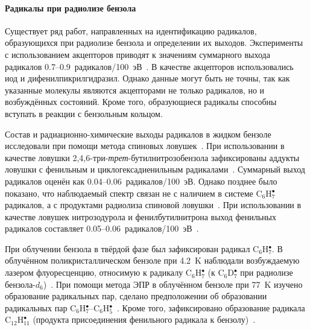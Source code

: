 {\paragraph{Радикалы при радиолизе бензола\\}
\label{rad}

Существует ряд работ, направленных на идентификацию радикалов, образующихся при радиолизе бензола и определении их выходов. 
Эксперименты с использованием  акцепторов приводят к значениям суммарного выхода радикалов 0.7--0.9~радикалов/100~эВ~\cite{Cherniak1964, Weber1955}.
В качестве акцепторов использовались иод и дифенилпикрилгидразил. Однако данные могут быть не точны, так как указанные молекулы 
являются акцепторами не только радикалов, но и возбуждённых состояний. Кроме того, образующиеся радикалы способны вступать 
в реакции с бензольным кольцом.

Состав и радиационно-химические выходы радикалов в жидком бензоле исследовали при помощи метода спиновых ловушек~\cite{Sargent1977}. 
При использовании в качестве ловушки 2,4,6-три-{\it трет}-бутилнитрозобензола зафиксированы аддукты ловушки с фенильным и 
циклогексадиенильным радикалами~\cite{ST1}. Суммарный выход радикалов оценён как 0.04--0.06~радикалов/100~эВ.
Однако позднее было показано, что наблюдаемый спектр связан не с наличием в системе C$_6$H$_7^\bullet$ радикалов, а с продуктами радиолиза спиновой ловушки~\cite{ST2}.
При использовании в качестве ловушек нитрозодурола и фенилбутилнитрона выход фенильных радикалов составляет 0.05--0.06~радикалов/100~эВ~\cite{ST1, ST3}. 

При облучении бензола в твёрдой фазе был зафиксирован радикал C$_6$H$_7^\bullet$.
В облучённом поликристаллическом бензоле при 4.2~K наблюдали возбуждаемую лазером флуоресценцию, относимую к радикалу C$_6$H$_7^\bullet$ 
(к C$_6$D$_7^\bullet$ при радиолизе бензола-$d_6$)~\cite{Sheng1978}. При помощи метода ЭПР в облучённом бензоле при 77~K изучено образование радикальных пар, 
сделано предположении об образовании радикальных пар C$_6$H$_7^\bullet$--C$_6$H$_5^\bullet$~\cite{Matsuyama1978a, Matsuyama1978}.
Кроме того, зафиксировано образование радикала C$_{12}$H$_{11}^\bullet$ (продукта присоединения фенильного радикала к бензолу)~\cite{Fessenden1963}. 

}
